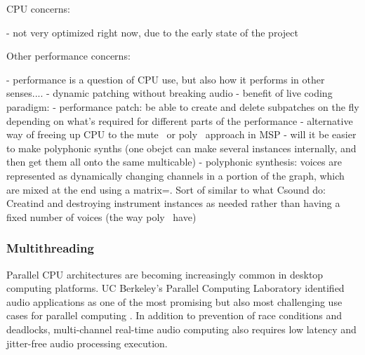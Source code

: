\documentclass[twoside,a4paper]{article}
\begin{document}
CPU concerns:

- not very optimized right now, due to the early state of the project

 
Other performance concerns:

- performance is a question of CPU use, but also how it performs in other senses....
- dynamic patching without breaking audio
- benefit of live coding paradigm:
    - performance patch: be able to create and delete subpatches on the fly depending on what's required for different parts of the performance
    - alternative way of freeing up CPU to the mute~ or poly~ approach in MSP
    - will it be easier to make polyphonic synths (one obejct can make several instances internally, and then get them all onto the same multicable)
    - polyphonic synthesis: voices are represented as dynamically changing channels in a portion of the graph, which are mixed at the end using a matrix=. Sort of similar to what Csound do: Creatind and destroying instrument instances as needed rather than having a fixed number of voices (the way poly~ have)

%


\subsubsection{Multithreading} %

Parallel CPU architectures are becoming increasingly common in desktop computing platforms.
UC Berkeley's Parallel Computing Laboratory identified audio applications as one of the most promising but also most challenging use cases for parallel computing \cite{asanovic2008parallel}. 
In addition to prevention of race conditions and deadlocks, multi-channel real-time audio computing also requires low latency and jitter-free audio processing execution.
\end{document}
